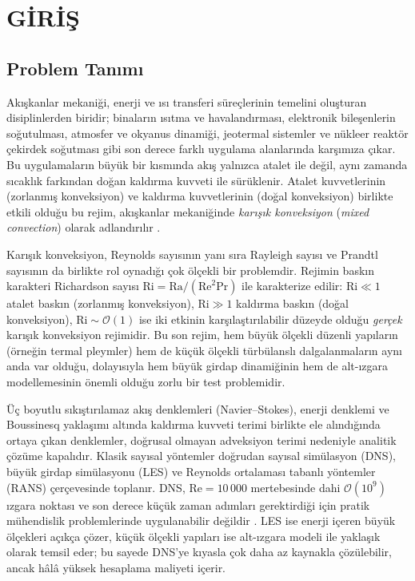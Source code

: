 \chapter{GİRİŞ}

\section{Problem Tanımı}

Akışkanlar mekaniği, enerji ve ısı transferi süreçlerinin temelini oluşturan disiplinlerden biridir; binaların ısıtma ve havalandırması, elektronik bileşenlerin soğutulması, atmosfer ve okyanus dinamiği, jeotermal sistemler ve nükleer reaktör çekirdek soğutması gibi son derece farklı uygulama alanlarında karşımıza çıkar. Bu uygulamaların büyük bir kısmında akış yalnızca atalet ile değil, aynı zamanda sıcaklık farkından doğan kaldırma kuvveti ile sürüklenir. Atalet kuvvetlerinin (zorlanmış konveksiyon) ve kaldırma kuvvetlerinin (doğal konveksiyon) birlikte etkili olduğu bu rejim, akışkanlar mekaniğinde \emph{karışık konveksiyon} (\textit{mixed convection}) olarak adlandırılır \cite{bejan_convection_2013, incropera_heat_transfer_2017}.

Karışık konveksiyon, Reynolds sayısının yanı sıra Rayleigh sayısı ve Prandtl sayısının da birlikte rol oynadığı çok ölçekli bir problemdir. Rejimin baskın karakteri Richardson sayısı $\mathrm{Ri}=\mathrm{Ra}/(\mathrm{Re}^{2}\mathrm{Pr})$ ile karakterize edilir: $\mathrm{Ri}\ll 1$ atalet baskın (zorlanmış konveksiyon), $\mathrm{Ri}\gg 1$ kaldırma baskın (doğal konveksiyon), $\mathrm{Ri}\sim\mathcal{O}(1)$ ise iki etkinin karşılaştırılabilir düzeyde olduğu \emph{gerçek} karışık konveksiyon rejimidir. Bu son rejim, hem büyük ölçekli düzenli yapıların (örneğin termal pleymler) hem de küçük ölçekli türbülanslı dalgalanmaların aynı anda var olduğu, dolayısıyla hem büyük girdap dinamiğinin hem de alt-ızgara modellemesinin önemli olduğu zorlu bir test problemidir.

Üç boyutlu sıkıştırılamaz akış denklemleri (Navier--Stokes), enerji denklemi ve Boussinesq yaklaşımı altında kaldırma kuvveti terimi birlikte ele alındığında ortaya çıkan denklemler, doğrusal olmayan adveksiyon terimi nedeniyle analitik çözüme kapalıdır. Klasik sayısal yöntemler doğrudan sayısal simülasyon (DNS), büyük girdap simülasyonu (LES) ve Reynolds ortalaması tabanlı yöntemler (RANS) çerçevesinde toplanır. DNS, $\mathrm{Re}=10\,000$ mertebesinde dahi $\mathcal{O}(10^{9})$ ızgara noktası ve son derece küçük zaman adımları gerektirdiği için pratik mühendislik problemlerinde uygulanabilir değildir \cite{pope_turbulence_2000}. LES ise enerji içeren büyük ölçekleri açıkça çözer, küçük ölçekli yapıları ise alt-ızgara modeli ile yaklaşık olarak temsil eder; bu sayede DNS'ye kıyasla çok daha az kaynakla çözülebilir, ancak hâlâ yüksek hesaplama maliyeti içerir.

